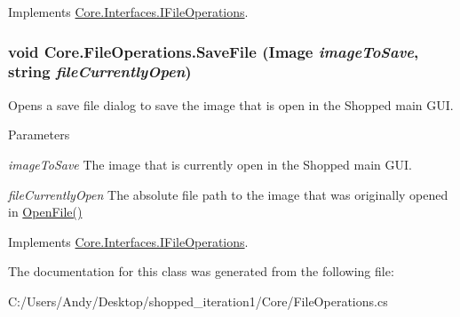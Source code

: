 Implements \hyperlink{interface_core_1_1_interfaces_1_1_i_file_operations}{Core.Interfaces.IFileOperations}.\hypertarget{class_core_1_1_file_operations_a93ad3dfb3b18dc15b2986ae831cc6eed}{
\subsubsection[{SaveFile}]{\setlength{\rightskip}{0pt plus 5cm}void Core.FileOperations.SaveFile (Image {\em imageToSave}, \/  string {\em fileCurrentlyOpen})}}
\label{class_core_1_1_file_operations_a93ad3dfb3b18dc15b2986ae831cc6eed}
Opens a save file dialog to save the image that is open in the Shopped main GUI.


\begin{DoxyParams}{Parameters}
\item[{\em imageToSave}]The image that is currently open in the Shopped main GUI. \item[{\em fileCurrentlyOpen}]The absolute file path to the image that was originally opened in \hyperlink{class_core_1_1_file_operations_a1f424475b7f385f349d9921186ed4beb}{OpenFile()} \end{DoxyParams}


Implements \hyperlink{interface_core_1_1_interfaces_1_1_i_file_operations}{Core.Interfaces.IFileOperations}.

The documentation for this class was generated from the following file:\begin{DoxyCompactItemize}
\item 
C:/Users/Andy/Desktop/shopped\_\-iteration1/Core/FileOperations.cs\end{DoxyCompactItemize}
